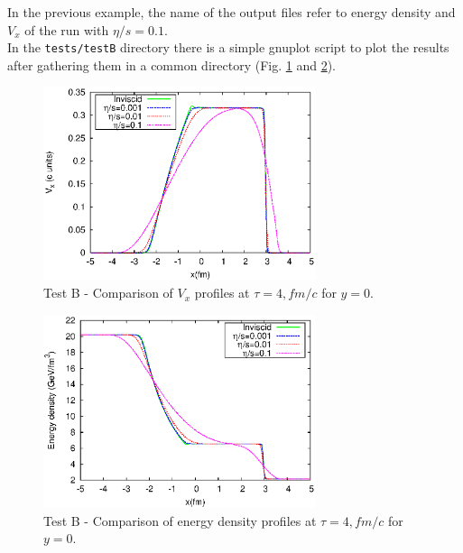In the previous example, the name of the output files refer to energy density and $V_x$ of the run with $\eta/s=0.1$.\\
In the {\tt tests/testB} directory there is a simple gnuplot script to plot the results after gathering them in a common directory (Fig. \ref{testB_final_velocity} and \ref{testB_final_energy_density}).\\
\begin{figure}[!h]
 \begin{center}
  \includegraphics[width=8cm]{images/vx-comparison-testB.eps}
   \caption{Test B - Comparison of $V_x$ profiles at $\tau=4,fm/c$ for $y=0$.}
    \label{testB_final_velocity}
 \end{center}
\end{figure}
\begin{figure}[!h]
 \begin{center}
  \includegraphics[width=8cm]{images/en-comparison-testB.eps}
   \caption{Test B - Comparison of energy density profiles at $\tau=4,fm/c$ for $y=0$.}
    \label{testB_final_energy_density}
 \end{center}
\end{figure}

